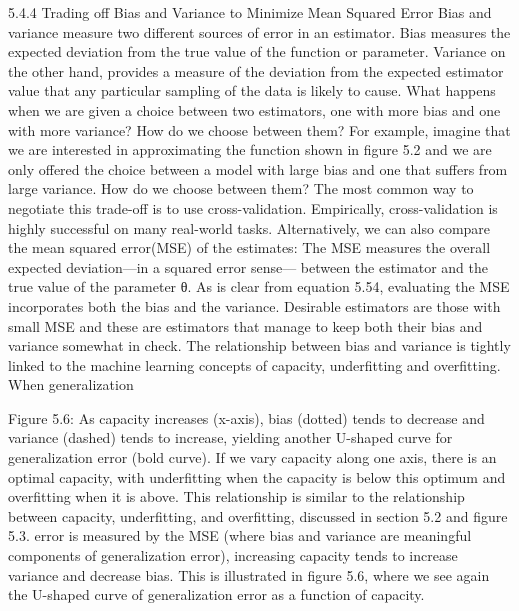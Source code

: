 \documentclass[11pt]{article}
\begin{document}
5.4.4 Trading oﬀ Bias and Variance to Minimize Mean Squared Error
Bias and variance measure two diﬀerent sources of error in an estimator.
Bias measures the expected deviation from the true value of the function or parameter.
Variance on the other hand, provides a measure of the deviation from the expected estimator value that any particular sampling of the data is likely to cause.
What happens when we are given a choice between two estimators, one with more bias and one with more variance?
How do we choose between them?
For example, imagine that we are interested in approximating the function shown in ﬁgure 5.2 and we are only oﬀered the choice between a model with large bias and one that suﬀers from large variance.
How do we choose between them?
The most common way to negotiate this trade-oﬀ is to use cross-validation.
Empirically, cross-validation is highly successful on many real-world tasks.
Alternatively, we can also compare the mean squared error(MSE) of the estimates:
The MSE measures the overall expected deviation—in a squared error sense—
between the estimator and the true value of the parameter θ.
As is clear from equation 5.54, evaluating the MSE incorporates both the bias and the variance.
Desirable estimators are those with small MSE and these are estimators that manage to keep both their bias and variance somewhat in check.
The relationship between bias and variance is tightly linked to the machine learning concepts of capacity, underﬁtting and overﬁtting.
When generalization

Figure 5.6: As capacity increases (x-axis), bias (dotted) tends to decrease and variance (dashed) tends to increase, yielding another U-shaped curve for generalization error (bold curve).
If we vary capacity along one axis, there is an optimal capacity, with underﬁtting when the capacity is below this optimum and overﬁtting when it is above.
This relationship is similar to the relationship between capacity, underﬁtting, and overﬁtting, discussed in section 5.2 and ﬁgure 5.3.
error is measured by the MSE (where bias and variance are meaningful components of generalization error), increasing capacity tends to increase variance and decrease bias.
This is illustrated in ﬁgure 5.6, where we see again the U-shaped curve of
generalization error as a function of capacity.
\end{document}
